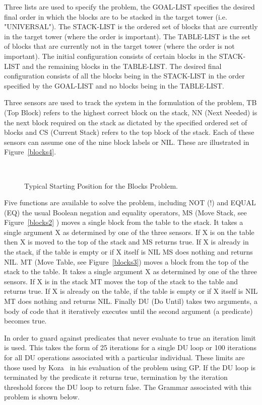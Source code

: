 Three lists are used to specify the problem, the GOAL-LIST specifies the desired final order in which the blocks are to be stacked in the target tower (i.e. "UNIVERSAL"). The STACK-LIST is the ordered set of blocks that are currently in the target tower (where the order is important). The TABLE-LIST is the set of blocks that are currently not in the target tower (where the order is not important). The initial configuration consists of certain blocks in the STACK-LIST and the remaining blocks in the TABLE-LIST. The desired final configuration consists of all the blocks being in the STACK-LIST in the order specified by the GOAL-LIST and no blocks being in the TABLE-LIST.

Three sensors are used to track the system in the formulation of the problem, TB (Top Block) refers to the highest correct block on the stack, NN (Next Needed) is the next block required on the stack as dictated by the specified ordered set of blocks and CS (Current Stack) refers to the top block of the stack. Each of these sensors can assume one of the nine block labels or NIL.  These are illustrated in Figure~\ref{blocks4}. 

\begin{figure}[]
\centerline{\hbox{
}}
\caption{\label{blocks1} Typical Starting Position for the Blocks Problem.}
\end{figure}

Five functions are available to solve the problem, including NOT (!) and EQUAL (EQ) the usual Boolean negation and equality operators, MS (Move Stack, see Figure~\ref{blocks2} ) moves a single block from the table to the stack. It takes a single argument X  as determined by  one of the three sensors. If X is on the table then X is moved to the top of the stack and MS returns true.
If X is already in the stack, if the table is empty or if X itself is NIL  MS does nothing and returns NIL.  MT (Move Table, see Figure~\ref{blocks3}) moves a block from the top of the stack to the table. It takes a single argument X  as determined by  one of the three sensors. If X is in the stack MT moves the top of the stack to the table and  returns true. 
If X is already on the table, if the table is empty or if X itself is NIL  MT does nothing and returns NIL. 
Finally DU (Do Until) takes two arguments, a body of code that it iteratively executes until the second argument (a predicate) becomes true.

In order to guard against predicates that never evaluate to true an iteration limit is used. This takes the form of 25 iterations for a single DU loop or 100 iterations for all DU operations associated with a particular individual. These limits are those used by Koza~\cite{koza} in his evaluation of the problem using GP. If the DU loop is terminated by the predicate it returns true, termination by the iteration threshold forces the DU loop to return false.
The Grammar associated with this problem is shown below.

